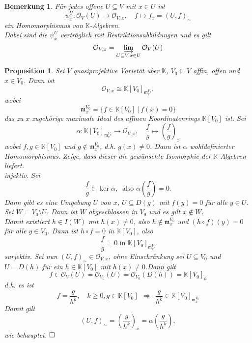 \documentclass[11pt]{book}
\newtheorem{prop}[theorem]{Proposition}
\newtheorem{remark}[theorem]{Bemerkung}
\theoremstyle{nonumberbreak}
\newenvironment{pr}[1][]{\ifthenelse{\equal{#1}{}}{\proof}{\proof[#1]}\rm}{\endproof}
\begin{document}
\begin{spacing}{1.3}
\begin{remark} %

Für jedes offene $U \subseteq V$ mit $x \in U$ ist 
$$\psi_x^{U}: \mathcal{O}_V(U) \longrightarrow \mathcal{O}_{V,x}, \quad f \mapsto f_x = (U,f)_{\sim} $$
ein Homomorphismus von $\mathbb{K}$-Algebren.\\
Dabei sind die $\psi_x^{U}$ verträglich mit Restriktionsabbildungen und es gilt
$$\mathcal{O}_{V,x} = \varinjlim_{U \subseteq V, x \in U} \mathcal{O}_V(U)$$
\end{remark}

\begin{prop} %

Sei $V$ quasiprojektive Varietät über $\mathbb{K}$, $V_0 \subseteq V$ affin, offen und $x \in V_0$. Dann ist 
$$ \mathcal{O}_{V,x} \cong \mathbb{K}[V_0]_{\mathfrak{m}_x^{V_0}},$$
wobei 
$$ \mathfrak{m}_x^{V_0} = \{f \in \mathbb{K}[V_0] \ \vert \ f(x) = 0 \}$$
das zu $x$ zugehörige maximale Ideal des affinen Koordinatenrings $\mathbb{K}[V_0]$ ist.
\begin{pr}
Sei
$$ \alpha: \mathbb{K}[V_0]_{\mathfrak{m}_x^{V_0}} \longrightarrow \mathcal{O}_{V,x}, \quad \frac{f}{g} \mapsto \left(\frac{f}{g} \right)_x$$
wobei $f,g \in \mathbb{K}[V_0]$ und $g \notin \mathfrak{m}_x^{V_0}$, d.h. $g(x) \neq 0$. Dann ist $\alpha$ wohldefinierter Homomorphismus. Zeige, dass dieser die gewünschte Isomorphie der $\mathbb{K}$-Algebren liefert.\\
\textit{injektiv.} Sei $$\frac{f}{g} \in \ker \alpha, \  \textrm{ also } \alpha\left(\frac{f}{g}\right)=0.$$
Dann gibt es eine Umgebung $U$ von $x$, $U \subseteq D(g)$ mit $f(y)=0$ für alle $y \in U$.\\
Sei $W = V_0 \setminus U$. Dann ist $W$ abgeschlossen in $V_0$ und es gilt $x \notin W$.\\
Damit existiert $h \in I(W)$ mit $h(x) \neq0$, also $ h \notin \mathfrak{m}_x^{V_0}$ und $(h \circ f) (y) =0$ für alle $y \in V_0$.
Dann ist $h \circ f =0$ in $ \mathbb{K}[V_0]$, also $$\frac{f}{g} =0 \textrm{ in } \mathbb{K}[V_0]_{\mathfrak{m}_x^{V_0}}$$
\textit{surjektiv.} Sei nun $(U,f)_{\sim} \in \mathcal{O}_{V,x}$, ohne Einschränkung sei $U \subseteq V_0$ und $ U = D(h)$ für ein $h \in \mathbb{K}[V_0]$ mit $h(x) \neq 0$.Dann gilt
$$f \in \mathcal{O}_V(U) = \mathcal{O}_{V_0}(U) = \mathcal{O}_{V_0}(D(h)) = \mathbb{K}[V_0]_h$$
d.h. es ist
$$f = \frac{g}{h^k}, \quad k \geqslant 0, g \in \mathbb{K}[V_0] \ \ \Longrightarrow \ \ \frac{g}{h^k} \in \mathbb{K}[V_0] _{\mathfrak{m}_x^{V_0}}$$
Damit gilt
$$(U,f)_{\sim} = \left(\frac{g}{h^k}\right)_x = \alpha\left(\frac{g}{h^k}\right),$$
wie behauptet. $\hfill \Box$
\end{pr}
\end{prop}


\end{spacing}
\end{document}
